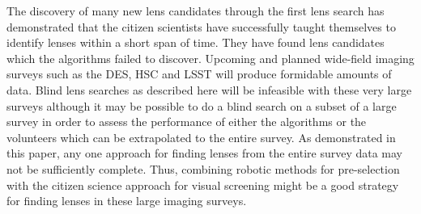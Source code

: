 \documentclass[useAMS,usenatbib,a4paper]{mn2e}
\begin{document}
The discovery of many new lens candidates through the first \sw lens
search has demonstrated that the citizen scientists have successfully
taught themselves to identify lenses within a short span of time.  They
have found lens candidates which the algorithms failed to discover.
Upcoming and planned wide-field imaging surveys such as the DES, HSC and
LSST will produce formidable amounts of data.  Blind lens searches as
described here will be infeasible with these very large surveys although
it may be possible to do a blind search on a subset of a large survey in
order to assess the performance of either the algorithms or the
volunteers which can be extrapolated to the entire survey.  As
demonstrated in this paper, any one approach for finding lenses from the
entire survey data may not be sufficiently complete. Thus, combining
robotic methods for pre-selection with the citizen science approach for
visual screening might be a good strategy for finding lenses in these
large imaging surveys.
\end{document}
